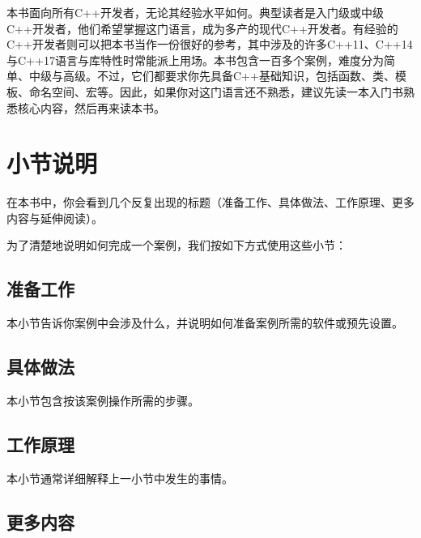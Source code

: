 
本书面向所有C++开发者，无论其经验水平如何。典型读者是入门级或中级C++开发者，他们希望掌握这门语言，成为多产的现代C++开发者。有经验的C++开发者则可以把本书当作一份很好的参考，其中涉及的许多C++11、C++14与C++17语言与库特性时常能派上用场。本书包含一百多个案例，难度分为简单、中级与高级。不过，它们都要求你先具备C++基础知识，包括函数、类、模板、命名空间、宏等。因此，如果你对这门语言还不熟悉，建议先读一本入门书熟悉核心内容，然后再来读本书。



\section*{小节说明}



在本书中，你会看到几个反复出现的标题（准备工作、具体做法、工作原理、更多内容与延伸阅读）。



为了清楚地说明如何完成一个案例，我们按如下方式使用这些小节：



\subsection*{准备工作}



本小节告诉你案例中会涉及什么，并说明如何准备案例所需的软件或预先设置。



\subsection*{具体做法}



本小节包含按该案例操作所需的步骤。



\subsection*{工作原理}



本小节通常详细解释上一小节中发生的事情。



\subsection*{更多内容}


